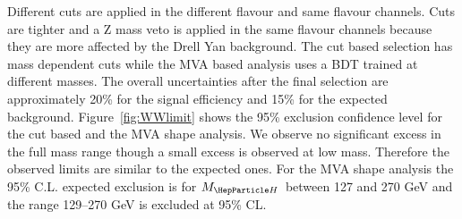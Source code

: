 \documentclass{cimento}
\newcommand{\MH}{\ensuremath{M_{\PH}}}
\newcommand{\pt}{\ensuremath{p_{\mathrm{T}}}\xspace}
\begin{document}
Different cuts are applied in the different flavour and same flavour
channels. Cuts are tighter and a Z mass veto is applied in the same
flavour channels because they are more affected by the Drell Yan
background.  The cut based selection has mass dependent cuts while the
MVA based analysis uses a BDT trained at different masses.  
The overall uncertainties after the final selection are approximately 20\%
for the signal efficiency and 15\% for the expected background.  
Figure~\ref{fig:WWlimit} shows the 95\% exclusion confidence level for
the cut based and the MVA shape analysis.  We observe no significant
excess in the full mass range though a small excess is observed at low
mass. Therefore the observed limits are similar to the expected ones.
For the MVA shape analysis the 95\% C.L. expected exclusion is
for \MH\ between 127 and 270 GeV and the range 129--270 GeV is
excluded at 95\% CL.
\end{document}
